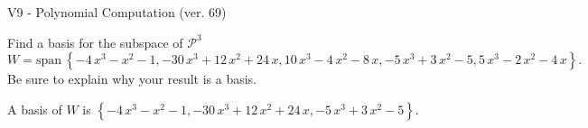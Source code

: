 \begin{exercise}
  \begin{exerciseTitle}V9 - Polynomial Computation (ver. 69)\end{exerciseTitle}
  \begin{exerciseStatement}
    Find a basis for the subspace of \(\mathcal{P}^3\) 
\[W=\mathrm{span}\ \left\{-4 \, x^{3} - x^{2} - 1 , -30 \, x^{3} + 12 \, x^{2} + 24 \, x , 10 \, x^{3} - 4 \, x^{2} - 8 \, x , -5 \, x^{3} + 3 \, x^{2} - 5 , 5 \, x^{3} - 2 \, x^{2} - 4 \, x\right\}.\]
 Be sure to explain why your result is a basis.


  \end{exerciseStatement}
  \begin{exerciseAnswer}
   A basis of \(W\) is  \(\left\{-4 \, x^{3} - x^{2} - 1 , -30 \, x^{3} + 12 \, x^{2} + 24 \, x , -5 \, x^{3} + 3 \, x^{2} - 5\right\}\).
  


  \end{exerciseAnswer}
\end{exercise}